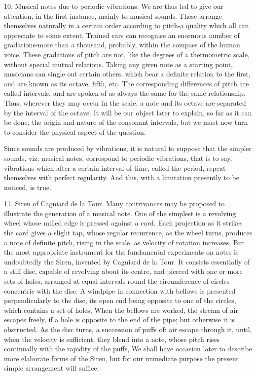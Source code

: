 10.  Musical notes due to periodic vibrations.  We are thus led to give our
attention, in the first instance, mainly to musical sounds. These arrange
themselves naturally in a certain order according to pitch-a quality which all
can appreciate to some extent.  Trained ears can recognise an enormous number
of gradations-more than a thousand, probably, within the compass of the human
voice. These gradations of pitch are not, like the degrees of a thermometric
scale, without special mutual relations. Taking any given note as a starting
point, musicians can single out certain others, which bear a definite relation
to the first, and are known as its octave, fifth, etc. The corresponding
differences of pitch are called intervals, and are spoken of as always the same
for the same relationship. Thus, wherever they may occur in the scale, a note
and its octave are separated by the interval of the octave. It will be our
object later to explain, so far as it can be done, the origin and nature of the
consonant intervals, but we must now turn to consider the physical aspect of
the question.

Since sounds are produced by vibrations, it is natural to suppose that the
simpler sounds, viz. musical notes, correspond to periodic vibrations, that is
to say, vibrations which after a certain interval of time, called the period,
repeat themselves with perfect regularity. And this, with a limitation
presently to be noticed, is true.

11.  Siren of Cagniard de la Tour.  Many contrivances may be proposed to
illustrate the generation of a musical note. One of the simplest is a revolving
wheel whose milled edge is pressed against a card. Each projection as it
strikes the card gives a slight tap, whose regular recurrence, as the wheel
turns, produces a note of definite pitch, rising in the scale, as velocity of
rotation increases, But the most appropriate instrument for the fundamental
experiments on notes is undoubtedly the Siren, invented by Cagniard de la Tour.
It consists essentially of a stiff disc, capable of revolving about its centre,
and pierced with one or more sets of holes, arranged at equal intervals round
the circumference of circles concentric with the disc. A windpipe in connection
with bellows is presented perpendicularly to the disc, its open end being
opposite to one of the circles, which contains a set of holes, When the bellows
are worked, the stream of air escapes freely, if a hole is opposite to the end
of the pipe; but otherwise it is obstructed. As the disc turns, a succession of
puffs of: air escape through it, until, when the velocity is sufficient, they
blend into a note, whose pitch rises continually with the rapidity of the
puffs, We shall have occasion later to describe more elaborate forms of the
Siren, but for our immediate purpose the present simple arrangement will
suffice.

